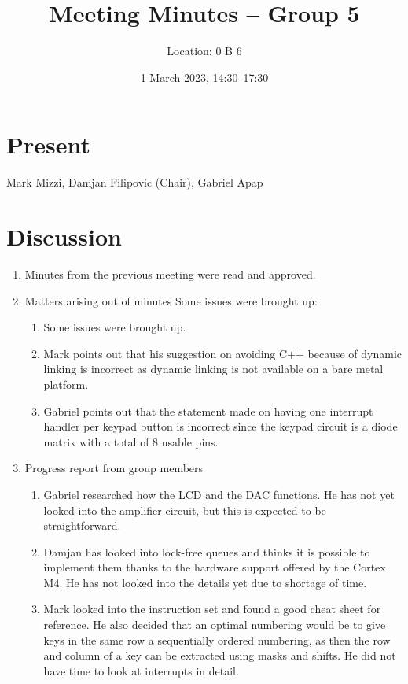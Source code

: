 \documentclass[11pt,a4paper]{scrartcl}
\title{Meeting Minutes -- Group 5}
\author{Location: 0 B 6}
\date{1 March 2023, 14:30--17:30}
\begin{document}
\maketitle

\section*{Present}
Mark Mizzi,
Damjan Filipovic (Chair),
Gabriel Apap

\section*{Discussion}

\begin{enumerate}


\item Minutes from the previous meeting were read and approved.

\item Matters arising out of minutes
    Some issues were brought up:
    \begin{enumerate}
        \item Some issues were brought up.
        \item Mark points out that his suggestion on avoiding C++ because of dynamic linking is incorrect as dynamic linking
            is not available on a bare metal platform.
        \item Gabriel points out that the statement made on having one interrupt handler per keypad button is incorrect since the
            keypad circuit is a diode matrix with a total of 8 usable pins.
    \end{enumerate}

\item Progress report from group members
   \begin{enumerate}
        \item Gabriel researched how the LCD and the DAC functions. He has not yet looked into the amplifier circuit,
            but this is expected to be straightforward.
        \item Damjan has looked into lock-free queues and thinks it is possible to implement them thanks to the
            hardware support offered by the Cortex M4. He has not looked into the details yet due to shortage of time.
        \item Mark looked into the instruction set and found a good cheat sheet for reference. He also decided that an
            optimal numbering would be to give keys in the same row a sequentially ordered numbering, as then the row
            and column of a key can be extracted using masks and shifts.
            He did not have time to look at interrupts in detail.
   \end{enumerate}


\end{enumerate}
\end{document}
